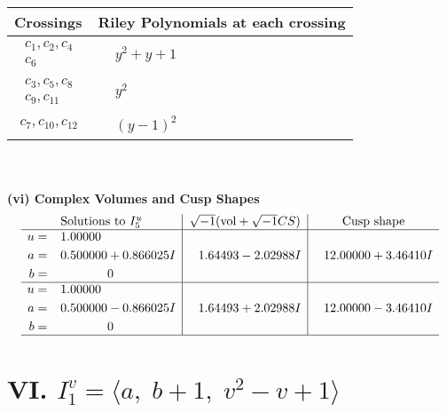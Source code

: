 \documentclass[1p]{elsarticle_modified}
\theoremstyle{definition}
\newcommand{\I}{\sqrt{-1}}
\begin{document}
\begin{tabular}{m{50pt}|m{274pt}}
Crossings & \hspace{64pt}Riley Polynomials at each crossing \\
\hline $$\begin{aligned}c_{1},c_{2},c_{4}\\c_{6}\end{aligned}$$&$\begin{aligned}
&y^2+y+1
\end{aligned}$\\
\hline $$\begin{aligned}c_{3},c_{5},c_{8}\\c_{9},c_{11}\end{aligned}$$&$\begin{aligned}
&y^2
\end{aligned}$\\
\hline $$\begin{aligned}c_{7},c_{10},c_{12}\end{aligned}$$&$\begin{aligned}
&(y-1)^2
\end{aligned}$\\
\hline
\end{tabular}\\~\\
\newpage\flushleft \textbf{(vi) Complex Volumes and Cusp Shapes}
$$\begin{array}{c|c|c}  
\text{Solutions to }I^u_{5}& \I (\text{vol} + \sqrt{-1}CS) & \text{Cusp shape}\\
 \hline 
\begin{aligned}
u &= \phantom{-}1.00000\phantom{ +0.000000I} \\
a &= \phantom{-}0.500000 + 0.866025 I \\
b &= \phantom{-0.000000 } 0\end{aligned}
 & \phantom{-}1.64493 - 2.02988 I & \phantom{-}12.00000 + 3.46410 I \\ \hline\begin{aligned}
u &= \phantom{-}1.00000\phantom{ +0.000000I} \\
a &= \phantom{-}0.500000 - 0.866025 I \\
b &= \phantom{-0.000000 } 0\end{aligned}
 & \phantom{-}1.64493 + 2.02988 I & \phantom{-}12.00000 - 3.46410 I\\
 \hline 
 \end{array}$$\newpage\newpage\renewcommand{\arraystretch}{1}
\centering \section*{VI. $I^v_{1}= \langle a,\;b+1,\;v^2- v+1 \rangle$}
\end{document}
